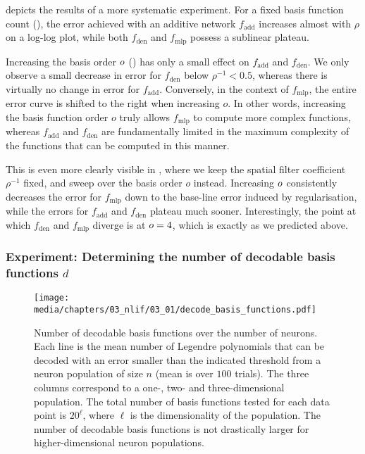  depicts the results of a more systematic experiment.
For a fixed basis function count (), the error achieved with an additive network $f_\mathrm{add}$ increases almost with $\rho$ on a log-log plot, while both $f_\mathrm{den}$ and $f_\mathrm{mlp}$ possess a sublinear plateau.

Increasing the basis order $o$ () has only a small effect on $f_\mathrm{add}$ and $f_\mathrm{den}$.
We only observe a small decrease in error for $f_\mathrm{den}$ below $\rho^{-1} < 0.5$, whereas there is virtually no change in error for $f_\mathrm{add}$.
Conversely, in the context of $f_\mathrm{mlp}$, the entire error curve is shifted to the right when increasing $o$.
In other words, increasing the basis function order $o$ truly allows $f_\mathrm{mlp}$ to compute more complex functions, whereas $f_\mathrm{add}$ and $f_\mathrm{den}$ are fundamentally limited in the maximum complexity of the functions that can be computed in this manner.

This is even more clearly visible in , where we keep the spatial filter coefficient $\rho^{-1}$ fixed, and sweep over the basis order $o$ instead.
Increasing $o$ consistently decreases the error for $f_\mathrm{mlp}$ down to the base-line error induced by regularisation, while the errors for $f_\mathrm{add}$ and $f_\mathrm{den}$ plateau much sooner.
Interestingly, the point at which $f_\mathrm{den}$ and $f_\mathrm{mlp}$ diverge is at $o = 4$, which is exactly as we predicted above.


\subsubsection{Experiment: Determining the number of decodable basis functions $d$}

\begin{figure}
	\centering
	\texttt{[image: media/chapters/03\_nlif/03\_01/decode\_basis\_functions.pdf]}
	\caption[Number of decodable basis functions over the number of neurons]{Number of decodable basis functions over the number of neurons. Each line is the mean number of Legendre polynomials  that can be decoded with an error smaller than the indicated threshold from a \ReLU neuron population of size $n$ (mean is over $100$ trials). The three columns correspond to a one-, two- and three-dimensional population. The total number of basis functions tested for each data point is $20^\ell$, where $\ell$ is the dimensionality of the population.
	The number of decodable basis functions is not drastically larger for higher-dimensional neuron populations.}
	\label{fig:decode_basis_functions}
\end{figure}

